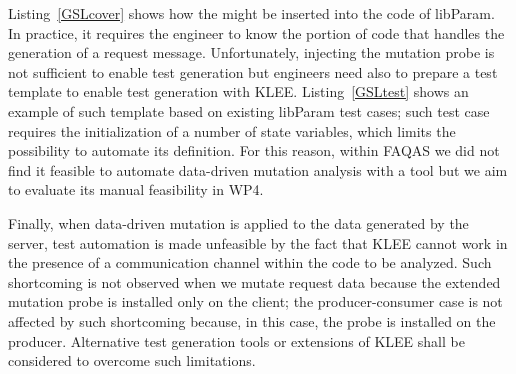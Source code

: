 Listing~\ref{GSLcover} shows how the  might be inserted into the code of libParam. In practice, it requires the engineer to know the portion of code that handles the generation of a request message. Unfortunately, injecting the mutation probe is not sufficient to enable test generation but engineers need also to prepare a test template to enable test generation with KLEE. Listing~\ref{GSLtest} shows an example of such template based on existing libParam test cases; such test case requires the initialization of a number of state variables, which limits the possibility to automate its definition. For this reason, within FAQAS we did not find it feasible to automate data-driven mutation analysis with a tool but we aim to evaluate its manual feasibility in WP4.

Finally, when data-driven mutation is applied to the data generated by the server, test automation is made unfeasible by the fact that KLEE cannot work in the presence of a communication channel within the code to be analyzed. Such shortcoming is not observed when we mutate request data because the extended mutation probe is installed only on the client; the producer-consumer case is not affected by such shortcoming because, in this case, the probe is installed on the producer. Alternative test generation tools or extensions of KLEE shall be considered to overcome such limitations.







\ENDCHANGEDWPT

%
%
%
%





